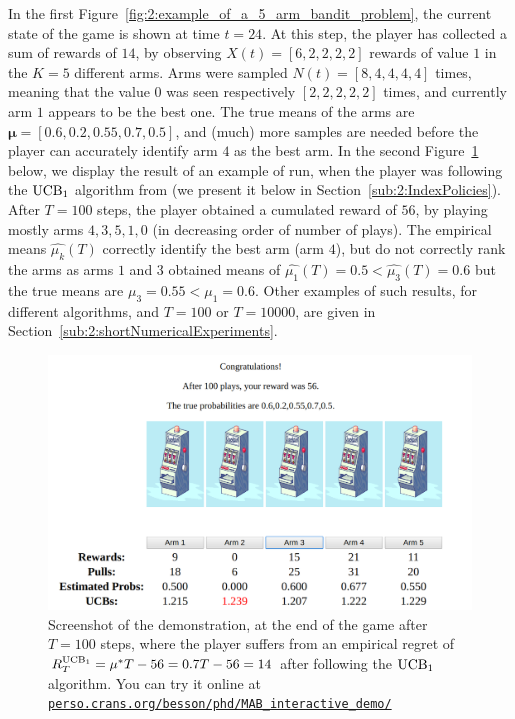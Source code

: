 In the first Figure~\ref{fig:2:example_of_a_5_arm_bandit_problem}, the current state of the game is shown at time $t=24$.
At this step, the player has collected a sum of rewards of $14$, by observing $X(t) = [6,2,2,2,2]$ rewards of value $1$ in the $K=5$ different arms. Arms were sampled $N(t) = [8,4,4,4,4]$ times, meaning that the value $0$ was seen respectively $[2,2,2,2,2]$ times, and currently arm $1$ appears to be the best one. The true means of the arms are $\bm{\mu}=[0.6, 0.2, 0.55, 0.7, 0.5]$, and (much) more samples are needed before the player can accurately identify arm $4$ as the best arm.
%
In the second Figure~\ref{fig:2:example_of_a_5_arm_bandit_problem__step100} below, we display the result of an example of run, when the player was following the $\mathrm{UCB}_1$ algorithm from \cite{Auer02} (we present it below in Section~\ref{sub:2:IndexPolicies}).
After $T=100$ steps, the player obtained a cumulated reward of $56$, by playing mostly arms $4,3,5,1,0$ (in decreasing order of number of plays). The empirical means $\widehat{\mu_k}(T)$ correctly identify the best arm (arm $4$), but do not correctly rank the arms as arms $1$ and $3$ obtained means of $\widehat{\mu_1}(T) = 0.5 < \widehat{\mu_3}(T)=0.6$ but the true means are $\mu_3 = 0.55 < \mu_1 = 0.6$.
Other examples of such results, for different algorithms, and $T=100$ or $T=10000$, are given in Section~\ref{sub:2:shortNumericalExperiments}.

\begin{figure}[h!]  %
    \centering
    \includegraphics[width=0.85\linewidth]{2-Chapters/2-Chapter/Images/example_of_a_5_arm_bandit_problem__step100.png}
    \caption[Screenshot of the demonstration, at the end of the game after $T=100$ steps.]{Screenshot of the demonstration, at the end of the game after $T=100$ steps, where the player suffers from an empirical regret of $R^{\mathrm{UCB}_1}_T = \mu^* T - 56 = 0.7 T - 56 = 14$ after following the $\mathrm{UCB}_1$ algorithm.
        You can try it online at \href{https://perso.crans.org/besson/phd/MAB\_interactive\_demo/}{\texttt{perso.crans.org/besson/phd/MAB\_interactive\_demo/}}}
    \label{fig:2:example_of_a_5_arm_bandit_problem__step100}
\end{figure}


